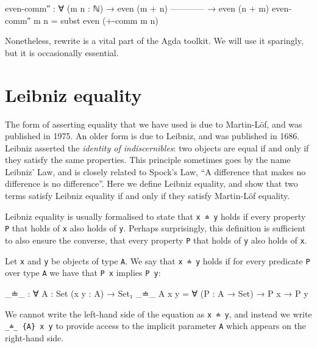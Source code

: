 \begin{fence}
\begin{code}
even-comm″ : ∀ (m n : ℕ)
  → even (m + n)
    ------------
  → even (n + m)
even-comm″ m n  =  subst even (+-comm m n)
\end{code}
\end{fence}

Nonetheless, rewrite is a vital part of the Agda toolkit. We will use it
sparingly, but it is occasionally essential.

\hypertarget{leibniz-equality}{%
\section{Leibniz equality}\label{leibniz-equality}}

The form of asserting equality that we have used is due to Martin-Löf,
and was published in 1975. An older form is due to Leibniz, and was
published in 1686. Leibniz asserted the \emph{identity of
indiscernibles}: two objects are equal if and only if they satisfy the
same properties. This principle sometimes goes by the name Leibniz' Law,
and is closely related to Spock's Law, ``A difference that makes no
difference is no difference''. Here we define Leibniz equality, and show
that two terms satisfy Leibniz equality if and only if they satisfy
Martin-Löf equality.

Leibniz equality is usually formalised to state that \texttt{x\ ≐\ y}
holds if every property \texttt{P} that holds of \texttt{x} also holds
of \texttt{y}. Perhaps surprisingly, this definition is sufficient to
also ensure the converse, that every property \texttt{P} that holds of
\texttt{y} also holds of \texttt{x}.

Let \texttt{x} and \texttt{y} be objects of type \texttt{A}. We say that
\texttt{x\ ≐\ y} holds if for every predicate \texttt{P} over type
\texttt{A} we have that \texttt{P\ x} implies \texttt{P\ y}:

\begin{fence}
\begin{code}
_≐_ : ∀ {A : Set} (x y : A) → Set₁
_≐_ {A} x y = ∀ (P : A → Set) → P x → P y
\end{code}
\end{fence}

We cannot write the left-hand side of the equation as \texttt{x\ ≐\ y},
and instead we write \texttt{\_≐\_\ \{A\}\ x\ y} to provide access to
the implicit parameter \texttt{A} which appears on the right-hand side.

